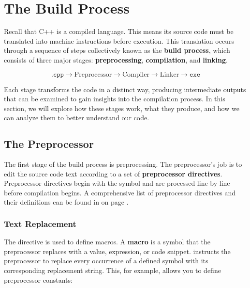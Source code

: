 \documentclass[12pt]{article}
\begin{document}
\tableofcontents

\pagebreak

\section{The Build Process}

\noindent
Recall that C++ is a compiled language.
This means its source code must be translated into machine instructions before execution.
This translation occurs through a sequence of steps collectively known as the \textbf{build process}, which consists of three major stages: \textbf{preprocessing}, \textbf{compilation}, and \textbf{linking}.

\[\texttt{.cpp} \rightarrow \boxed{\textrm{Preprocessor}} \rightarrow \boxed{\textrm{Compiler}} \rightarrow \boxed{\textrm{Linker}} \rightarrow \texttt{exe}\]

\noindent
Each stage transforms the code in a distinct way, producing intermediate outputs that can be examined to gain insights into the compilation process.
In this section, we will explore how these stages work, what they produce, and how we can analyze them to better understand our code.

\subsection{The Preprocessor}

The first stage of the build process is preprocessing.
The preprocessor's job is to edit the source code text according to a set of \textbf{preprocessor directives}.
Preprocessor directives begin with the \inlinecxx{#} symbol and are processed line-by-line before compilation begins.
A comprehensive list of preprocessor directives and their definitions can be found in on page \pageref{tab:preprocessor-directives}.

\subsubsection{Text Replacement }
\label{sec:text-replacement}

\noindent
The  directive is used to define macros.
A \textbf{macro} is a symbol that the preprocessor replaces with a value, expression, or code snippet.
 instructs the preprocessor to replace every occurrence of a defined symbol with its corresponding replacement string.
This, for example, allows you to define preprocessor constants:
\end{document}
